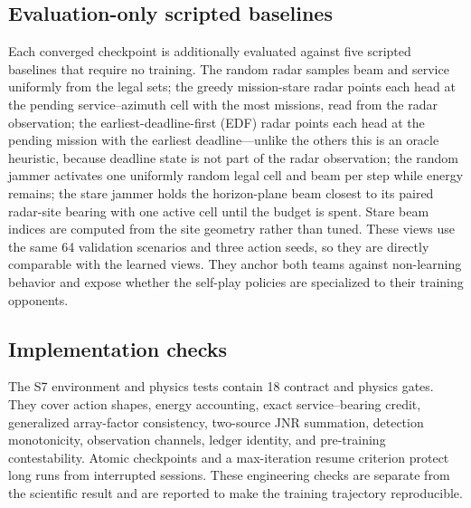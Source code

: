 \subsection{Evaluation-only scripted baselines}
Each converged checkpoint is additionally evaluated against five scripted baselines that require no training. The random radar samples beam and service uniformly from the legal sets; the greedy mission-stare radar points each head at the pending service--azimuth cell with the most missions, read from the radar observation; the earliest-deadline-first (EDF) radar points each head at the pending mission with the earliest deadline---unlike the others this is an oracle heuristic, because deadline state is not part of the radar observation; the random jammer activates one uniformly random legal cell and beam per step while energy remains; the stare jammer holds the horizon-plane beam closest to its paired radar-site bearing with one active cell until the budget is spent. Stare beam indices are computed from the site geometry rather than tuned. These views use the same 64 validation scenarios and three action seeds, so they are directly comparable with the learned views. They anchor both teams against non-learning behavior and expose whether the self-play policies are specialized to their training opponents.

\subsection{Implementation checks}
The S7 environment and physics tests contain 18 contract and physics gates. They cover action shapes, energy accounting, exact service--bearing credit, generalized array-factor consistency, two-source JNR summation, detection monotonicity, observation channels, ledger identity, and pre-training contestability. Atomic checkpoints and a max-iteration resume criterion protect long runs from interrupted sessions. These engineering checks are separate from the scientific result and are reported to make the training trajectory reproducible.
